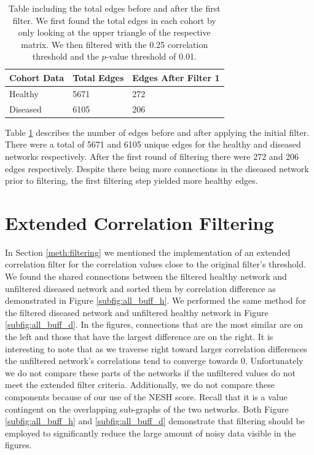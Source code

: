 \begin{table}[hbt]
\centering
\begin{tabular}{p{3cm} p{3cm} p{4cm}}
    \toprule
    Cohort Data & Total Edges & Edges After Filter 1 \\ 
    \midrule
    Healthy & 5671 & 272 \\ 
    Diseased & 6105 & 206 \\ 
   \bottomrule
\end{tabular}
\caption[Table including the total edges before and after the first filter.]{Table including the total edges before and after the first filter. We first found the total edges in each cohort by only looking at the upper triangle of the respective matrix. We then filtered with the 0.25 correlation threshold and the $p$-value threshold of 0.01. }
\label{tab:edge_table1}
\end{table}
Table \ref{tab:edge_table1} describes the number of edges before and after applying the initial filter. There were a total of 5671 and 6105 unique edges for the healthy and diseased networks respectively. After the first round of filtering there were 272 and 206 edges respectively. Despite there being more connections in the diseased network prior to filtering, the first filtering step yielded more healthy edges.

\section{Extended Correlation Filtering}\label{sec-res-buff}

In Section \ref{meth:filtering} we mentioned the implementation of an extended correlation filter for the correlation values close to the original filter's threshold. We found the shared connections between the filtered healthy network and unfiltered diseased network and sorted them by correlation difference as demonstrated in Figure \ref{subfig:all_buff_h}. We performed the same method for the filtered diseased network and unfiltered healthy network in Figure \ref{subfig:all_buff_d}. In the figures, connections that are the most similar are on the left and those that have the largest difference are on the right. It is interesting to note that as we traverse right toward larger correlation differences the unfiltered network's correlations tend to converge towards 0. Unfortunately we do not compare these parts of the networks if the unfiltered values do not meet the extended filter criteria. Additionally, we do not compare these components because of our use of the \acrshort{NESH} score. Recall that it is a value contingent on the overlapping sub-graphs of the two networks. Both Figure \ref{subfig:all_buff_h} and \ref{subfig:all_buff_d} demonstrate that filtering should be employed to significantly reduce the large amount of noisy data visible in the figures.

